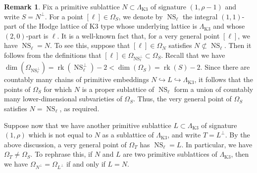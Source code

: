\documentclass[11pt,twoside]{amsart}
\numberwithin{equation}{section}
\theoremstyle{definition}
\newtheorem{remark}[dummy]{Remark}
\theoremstyle{plain}
\newcommand{\klat}{\ensuremath{\Lambda_{\operatorname{K3}}}}
\def\NS{\operatorname{NS}}
\def\rk{\operatorname{rk}}
\begin{document}
\begin{remark}\label{rem:perioddomainknowsaboutthelattice}
    Fix a primitive sublattice $N \subset \klat$ of signature $(1,\rho-1)$ and write $S = N^\perp$. For a point $[\ell]\in \Omega_S$, we denote by $\NS_\ell$ the integral $(1,1)$-part of the Hodge lattice of K3 type whose underlying lattice is $\klat$ and whose $(2,0)$-part is $\ell$. It is a well-known fact that, for a very general point $[\ell]$, we have $\NS_\ell = N$. To see this, suppose that $[\ell]\in \Omega_N$ satisfies $N\not\subset\NS_\ell.$ Then it follows from the definitions that $[\ell]\in \Omega_{\NS_\ell^\perp}\subset \Omega_S$. Recall that we have $\dim(\Omega_{\NS_\ell^\perp}) = \rk(\NS_\ell^\perp) - 2 < \dim(\Omega_S) =\rk(S)-2$. Since there are countably many chains of primitive embeddings $N\hookrightarrow L\hookrightarrow \klat$, it follows that the points of $\Omega_S$ for which $N$ is a proper sublattice of $\NS_\ell$ form a union of countably many lower-dimensional subvarieties of $\Omega_S$. Thus, the very general point of $\Omega_S$ satisfies $N = \NS_\ell$, as required.

    Suppose now that we have another primitive sublattice $L\subset\klat$ of signature $(1,\rho)$ which is not equal to $N$ as a sublattice of $\klat$, and write $T = L^\perp$. By the above discussion, a very general point of $\Omega_T$ has $\NS_\ell = L$. In particular, we have $\Omega_T\neq \Omega_S$. To rephrase this, if $N$ and $L$ are two primitive sublattices of $\klat$, then we have $\Omega_{N^\perp} = \Omega_{L^\perp}$ if and only if $L = N$.
\end{remark}
\end{document}
